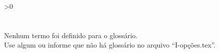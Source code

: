 \documentclass[
	12pt,				%
        openright, %
        twoside,   %
	a4paper,			%
	chapter=TITLE,		%
	english,			%
	french,				%
	spanish,			%
	brazil,				%
    ]{abntex2}
\newcounter{glsusedcount}
\begin{document}
\cleardoublepage

\tableofcontents*
\cleardoublepage

\textual









\postextual



\cleardoublepage


{}
{
    \cleardoublepage

    \ifnum\value{glsusedcount}>0
        \printglossaries
    \else
        \chapter*{\glossaryname}
        \markboth{\glossaryname}{\glossaryname}
        \vspace*{\fill}
        \begin{center}
            Nenhum termo foi definido para o glossário.\\Use algum ou informe que não há glossário no arquivo ``I-opções.tex''.
        \end{center}
        \vspace*{\fill}
    \fi
}
\end{document}
